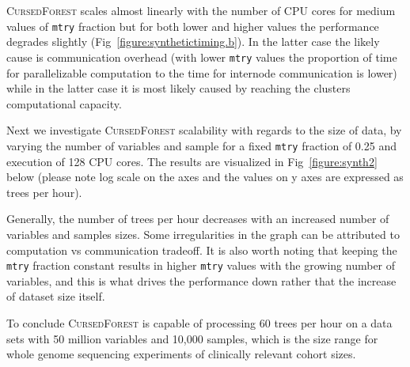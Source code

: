 \documentclass[10pt,letterpaper]{article}
\newcommand{\cursedforest}{\textsc{CursedForest}\xspace}
\newcommand{\mtry}{\texttt{mtry}\xspace}
\begin{document}
\cursedforest scales almost linearly with the number of CPU cores for medium values of \mtry fraction but for both lower
and higher values the performance degrades slightly (Fig~\ref{figure:synthetictiming.b}). In the latter case the likely
cause is communication overhead (with lower \mtry values the proportion of time for parallelizable computation to the
time for internode communication is lower) while in the latter case it is most likely caused by reaching the clusters
computational capacity.

Next we investigate \cursedforest scalability with regards to the size of data, by varying the number of variables and
sample for a fixed \mtry fraction of 0.25 and execution of 128 CPU cores. The results are visualized in
Fig~\ref{figure:synth2} below (please note log scale on the axes and the values on y axes are expressed as trees per
hour).

Generally, the number of trees per hour decreases with an increased number of variables and samples sizes. Some
irregularities in the graph can be attributed to computation vs communication tradeoff. It is also worth noting that
keeping the \mtry fraction constant results in higher \mtry values with the growing number of variables, and this is
what drives the performance down rather that the increase of dataset size itself.

To conclude \cursedforest is capable of processing 60 trees per hour on a data sets with 50 million variables and 10,000
samples, which is the size range for whole genome sequencing experiments of clinically relevant cohort sizes.
\end{document}
